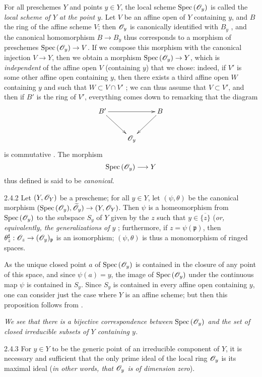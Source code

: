 For all preschemes $Y$ and points $y\in Y$, the local scheme ${\mathop{\mathrm{Spec}}\nolimits}\,(\mathscr{O}_y)$
is called the \emph{local scheme of $Y$ at the point $y$}. Let $V$ be an affine
open of $Y$ containing $y$, and $B$ the ring of the affine scheme $V$; then
$\mathscr{O}_y$ is canonically identified with $B_y$ , and the canonical
homomorphism $B\to B_y$ thus corresponds  to a morphism of preschemes
${\mathop{\mathrm{Spec}}\nolimits}\,(\mathscr{O}_y)\to V$.  If we compose this morphism with the canonical injection
$V\to Y$, then we obtain a morphism ${\mathop{\mathrm{Spec}}\nolimits}\,(\mathscr{O}_y)\to Y$, which is
\emph{independent} of the affine open $V$ (containing $y$) that we chose:
indeed, if $V'$ is some other affine open containing $y$, then there exists a
third affine open $W$ containing $y$ and such that $W\subset V\cap V'$ ;
we can thus assume that $V\subset V'$, and then if $B'$ is the ring of $V'$,
everything comes down to remarking that the diagram
\[
  \xymatrix{
    B'\ar[rr]\ar[dr] & & B\ar[dl]\\
    & \OO_y &
  }
\]
is commutative . The morphism
\[
  {\mathop{\mathrm{Spec}}\nolimits}\,(\mathscr{O}_y)\longrightarrow Y
\]
thus defined is said to be \emph{canonical}.
    
\begin{envs}[Proposition]{2.4.2}
\label{prop-1.2.4.2}
Let $(Y,\mathscr{O}_Y)$ be a prescheme; for all $y\in Y$, let $(\psi,\theta)$ be the canonical
morphism $({\mathop{\mathrm{Spec}}\nolimits}\,(\mathscr{O}_y),\widetilde{\mathscr{O}}_y)\to(Y,\mathscr{O}_Y)$. Then $\psi$ is a homeomorphism
from ${\mathop{\mathrm{Spec}}\nolimits}\,(\mathscr{O}_y)$ to the subspace $S_y$ of $Y$ given by the $z$ such that
$y\in\overline{\{z\}}$ (\emph{or, equivalently, the generalizations of $y$
}; furthermore, if $z=\psi(\mathfrak{p})$, then
$\theta_z^\sharp:\mathscr{O}_z\to(\mathscr{O}_y)_\mathfrak{p}$ is an isomorphism; $(\psi,\theta)$
is thus a monomorphism of ringed spaces.
\end{envs}
    
As the unique closed point $a$ of ${\mathop{\mathrm{Spec}}\nolimits}\,(\mathscr{O}_y)$ is contained in the closure of any
point of this space, and since $\psi(a)=y$, the image of ${\mathop{\mathrm{Spec}}\nolimits}\,(\mathscr{O}_y)$ under
the continuous map $\psi$ is contained in $S_y$. Since $S_y$ is contained in
every affine open containing $y$, one can consider just the case where $Y$ is an
affine scheme; but then this proposition follows from .
    
\emph{We see  that there is a bijective correspondence between
${\mathop{\mathrm{Spec}}\nolimits}\,(\mathscr{O}_y)$ and the set of closed irreducible subsets of $Y$ containing $y$.}
    
\begin{envs}[Corollary]{2.4.3}
\label{cor-1.2.4.3}
For $y\in Y$ to be the generic point of an
irreducible component of $Y$, it is necessary and sufficient that the only prime
ideal of the local ring $\mathscr{O}_y$ is its maximal ideal (\emph{in other words, that
$\mathscr{O}_y$ is of \emph{dimension zero}}).
\end{envs}
    
